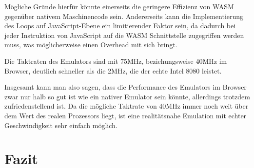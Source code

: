 Mögliche Gründe hierfür könnte einerseits die geringere Effizienz von \ac{WASM} gegenüber nativem Maschinencode sein. Andererseits kann die Implementierung des Loops auf JavaScript-Ebene ein limitierender Faktor sein, da dadurch bei jeder Instruktion von JavaScript auf die \ac{WASM} Schnittstelle zugegriffen werden muss, was möglicherweise einen Overhead mit sich bringt.

Die Taktraten des Emulators sind mit 75MHz, beziehungsweise 40MHz im Browser, deutlich schneller als die 2MHz, die der echte Intel 8080 leistet.

Insgesamt kann man also sagen, dass die Performance des Emulators im Browser zwar nur halb so gut ist wie ein nativer Emulator sein könnte, allerdings trotzdem zufriedenstellend ist. Da die mögliche Taktrate von 40MHz immer noch weit über dem Wert des realen Prozessors liegt, ist eine realitätsnahe Emulation mit echter Geschwindigkeit sehr einfach möglich.

\section{Fazit}
